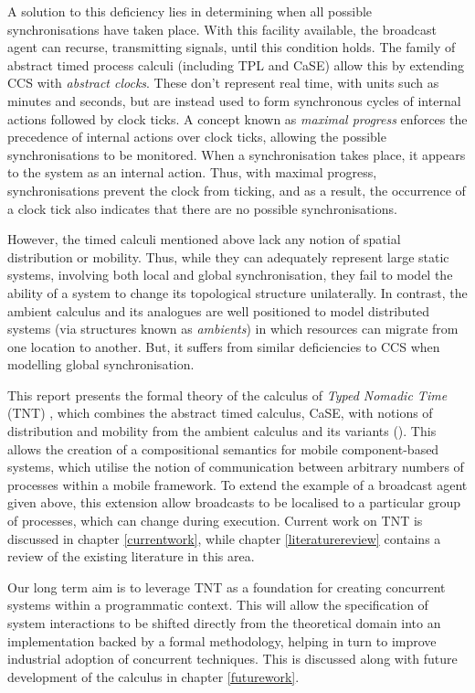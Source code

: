 A solution to this deficiency lies in determining when all possible
synchronisations have taken place.  With this facility available, the
broadcast agent can recurse, transmitting signals, until this
condition holds. The family of abstract timed process calculi
(including TPL\cite{hennessy:tpl} and CaSE\cite{CaSE}) allow this by
extending CCS with \emph{abstract clocks}.  These don't represent real
time, with units such as minutes and seconds, but are instead used to
form synchronous cycles of internal actions followed by clock ticks.
A concept known as \emph{maximal progress} enforces the precedence of
internal actions over clock ticks, allowing the possible
synchronisations to be monitored.  When a synchronisation takes place,
it appears to the system as an internal action.  Thus, with maximal
progress, synchronisations prevent the clock from ticking, and as a
result, the occurrence of a clock tick also indicates that there are
no possible synchronisations.

However, the timed calculi mentioned above lack any notion of spatial
distribution or mobility. Thus, while they can adequately represent
large static systems, involving both local and global synchronisation,
they fail to model the ability of a system to change its topological
structure unilaterally. In contrast, the ambient calculus \cite{amb} and
its analogues are well positioned to model distributed systems (via
structures known as \emph{ambients}) in which resources can migrate from
one location to another. But, it suffers from similar deficiencies to
CCS when modelling global synchronisation.

This report presents the formal theory of the calculus of \emph{Typed
Nomadic Time} (TNT) \cite{hughes:nt}, which combines the abstract timed
calculus, CaSE, with notions of distribution and mobility from the
ambient calculus and its variants
(\cite{sangiorgi:mobsafeambients,controlledamb02}).  This allows the
creation of a compositional semantics for mobile component-based
systems, which utilise the notion of communication between arbitrary
numbers of processes within a mobile framework.  To extend the example
of a broadcast agent given above, this extension allow broadcasts to be
localised to a particular group of processes, which can change during
execution.  Current work on TNT is discussed in chapter
\ref{currentwork}, while chapter \ref{literaturereview} contains a
review of the existing literature in this area.  

Our long term aim is to leverage TNT as a foundation for creating
concurrent systems within a programmatic context. This will allow the
specification of system interactions to be shifted directly from the
theoretical domain into an implementation backed by a formal
methodology, helping in turn to improve industrial adoption of
concurrent techniques.  This is discussed along with future development
of the calculus in chapter \ref{futurework}.

